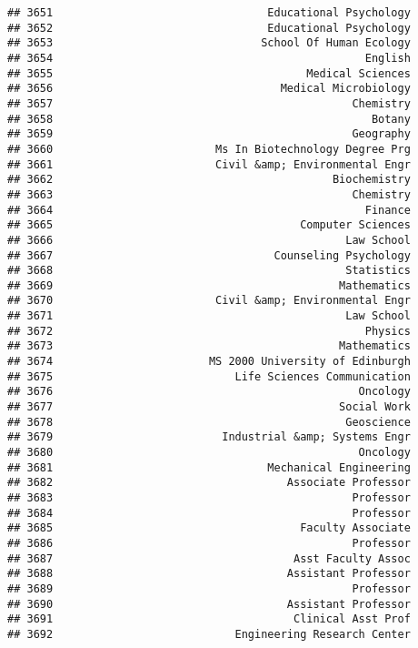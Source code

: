\documentclass[
]{article}
\begin{document}
\begin{verbatim}
## 3651                                 Educational Psychology
## 3652                                 Educational Psychology
## 3653                                School Of Human Ecology
## 3654                                                English
## 3655                                       Medical Sciences
## 3656                                   Medical Microbiology
## 3657                                              Chemistry
## 3658                                                 Botany
## 3659                                              Geography
## 3660                         Ms In Biotechnology Degree Prg
## 3661                         Civil &amp; Environmental Engr
## 3662                                           Biochemistry
## 3663                                              Chemistry
## 3664                                                Finance
## 3665                                      Computer Sciences
## 3666                                             Law School
## 3667                                  Counseling Psychology
## 3668                                             Statistics
## 3669                                            Mathematics
## 3670                         Civil &amp; Environmental Engr
## 3671                                             Law School
## 3672                                                Physics
## 3673                                            Mathematics
## 3674                        MS 2000 University of Edinburgh
## 3675                            Life Sciences Communication
## 3676                                               Oncology
## 3677                                            Social Work
## 3678                                             Geoscience
## 3679                          Industrial &amp; Systems Engr
## 3680                                               Oncology
## 3681                                 Mechanical Engineering
## 3682                                    Associate Professor
## 3683                                              Professor
## 3684                                              Professor
## 3685                                      Faculty Associate
## 3686                                              Professor
## 3687                                     Asst Faculty Assoc
## 3688                                    Assistant Professor
## 3689                                              Professor
## 3690                                    Assistant Professor
## 3691                                     Clinical Asst Prof
## 3692                            Engineering Research Center

\end{verbatim}
\end{document}
